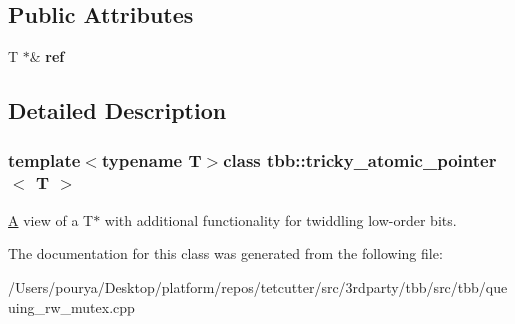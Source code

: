 \subsection*{Public Attributes}
\begin{DoxyCompactItemize}
\item 
\hypertarget{classtbb_1_1tricky__atomic__pointer_acce896f72ec2a6110073ad05b9cfe256}{}T $\ast$\& {\bfseries ref}\label{classtbb_1_1tricky__atomic__pointer_acce896f72ec2a6110073ad05b9cfe256}

\end{DoxyCompactItemize}


\subsection{Detailed Description}
\subsubsection*{template$<$typename T$>$class tbb\+::tricky\+\_\+atomic\+\_\+pointer$<$ T $>$}

\hyperlink{structA}{A} view of a T$\ast$ with additional functionality for twiddling low-\/order bits. 

The documentation for this class was generated from the following file\+:\begin{DoxyCompactItemize}
\item 
/\+Users/pourya/\+Desktop/platform/repos/tetcutter/src/3rdparty/tbb/src/tbb/queuing\+\_\+rw\+\_\+mutex.\+cpp\end{DoxyCompactItemize}
